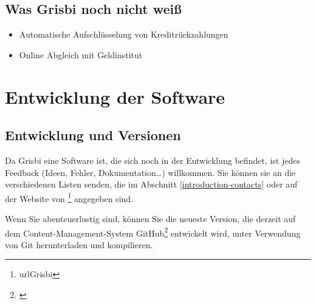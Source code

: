 \subsection{Was Grisbi noch nicht weiß}%

\begin{itemize}
	\item Automatische Aufschlüsselung von Kreditrückzahlungen%
	\item Online Abgleich mit Geldinstitut%
\end{itemize}


\section{Entwicklung der Software}%


\subsection{Entwicklung und Versionen\label{introduction-versions}}

Da Grisbi eine Software ist, die sich noch in der Entwicklung befindet, ist jedes Feedback (Ideen, Fehler, Dokumentation\dots{}) willkommen. Sie können sie an die verschiedenen Listen senden, die im Abschnitt \vref{introduction-contacts}  oder auf der Website von \footnote{urlGrisbi{}} angegeben sind.

Wenn Sie abenteuerlustig sind, können Sie die neueste Version, die derzeit auf dem Content-Management-System \gls{GitHub}\footnote{\urlGitHubGrisbi{}\label{siteGitHubGrisbi}} entwickelt wird, unter Verwendung von \gls{Git} herunterladen und kompilieren.

